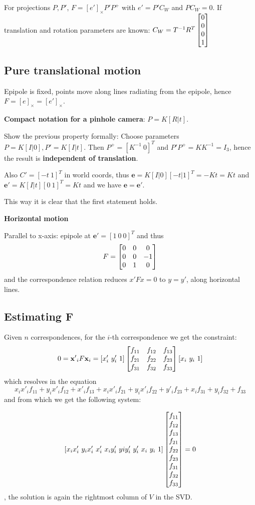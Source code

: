 For projections $P,P'$, $F = [e']_\times P' P^+$ with $e' = P'C_W$ and $PC_W = 0$. If translation and rotation parameters are known: $C_W = T^{-1} R^T \left[\begin{matrix}0\\0\\0\\1\end{matrix}\right]$

\subsection{Pure translational motion}

Epipole is fixed, points move along lines radiating from the epipole, hence $F = [e]_\times = [e']_\times$.

\textbf{Compact notation for a pinhole camera}: $P = K[R|t]$.

Show the previous property formally: Choose parameters $P = K[I | 0], P' = K[I | t]$. Then $P^+ = [K^{-1} \ 0]^T$ and $P'P^+ = KK^{-1} = I_3$, hence the result is \textbf{independent of translation}.

Also $C' = [-t \ 1]^T$ in world coords, thus $\mathbf{e} = K[I|0] [-t | 1]^T = -K t = Kt$ and $\mathbf{e'} = K[I|t][0 \ 1]^T = Kt$ and we have $\mathbf{e} = \mathbf{e'}$.

This way it is clear that the first statement holds.

\textbf{Horizontal motion}

Parallel to x-axis: epipole at $\mathbf{e'} = [1 \ 0 \ 0]^T$ and thus $$F = \left[\begin{matrix}0 & 0 & 0\\ 0 & 0 & -1 \\ 0 & 1 & 0\end{matrix}\right]$$ and the correspondence relation reduces $x' F x = 0$ to $y = y'$, along horizontal lines.

\subsection{Estimating F}
Given $n$ correspondences, for the $i$-th correspondence we get the constraint: 
$$0 = \mathbf{x'}_i F \mathbf{x}_i = [x'_i \ y'_i \ 1] \left[\begin{matrix}f_{11} & f_{12} & f_{13} \\ f_{21} & f_{22} & f_{23} \\ f_{31} & f_{32} & f_{33}\end{matrix}\right][x_i \ y_i \ 1]$$ which resolves in the equation $$x_ix'_i f_{11} + y_ix'_i f_{12} +x'_i f_{13} + x_ix'_i f_{21} + y_ix'_i f_{22} + y'_i f_{23} + x_i f_{31} + y_i f_{32} + f_{33}$$ and from which we get the following system:

$$[x_ix'_i \ y_ix'_i \ x'_i \ x_iy'_i \ yiy'_i \ y'_i \ x_i \ y_i \ 1] \rectmat{f_{11} \\ f_{12} \\ f_{13} \\ f_{21} \\ f_{22} \\ f_{23} \\ f_{31} \\ f_{32} \\ f_{33} \\} = 0$$, the solution is again the rightmost column of $V$ in the SVD.

